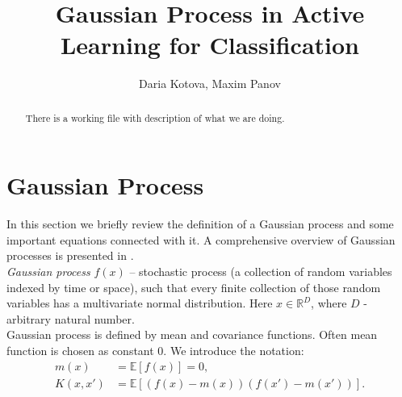 \documentclass[a4paper]{article}
\title{Gaussian Process in Active Learning for Classification}
\author{Daria Kotova, Maxim Panov}
\begin{document}
\maketitle

\setlength{\marginparwidth}{1.5 cm}

\begin{abstract}

There is a working file with description of what we are doing.

\end{abstract}

\section{Gaussian Process}

In this section we briefly review the definition of a Gaussian process and some important equations connected with it. A comprehensive overview of Gaussian processes is presented in \cite{gp}. \\
{\em  Gaussian process} $f\left(x\right)$ -- stochastic process (a collection of random variables indexed by time or space), such that every finite collection of those random variables has a multivariate normal distribution. Here $x \in \mathbb{R}^D$, where $D$ - arbitrary natural number. \\
Gaussian process is defined by mean and covariance functions. Often mean function is chosen as constant 0. We introduce the notation:
\begin{align*}
m\left(x\right) & = \mathds{E}\left[ f\left(x\right) \right] = 0, \\
K\left(x, x'\right) & = \mathds{E} \left[ \left(f\left(x\right) - m\left(x\right)\right) \left(f\left(x'\right) - m\left(x'\right)\right)\right].
\end{align*}
\end{document}
